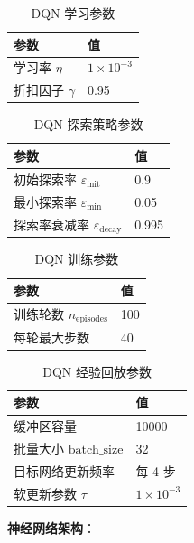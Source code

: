 \begin{table}[H]
\centering
\caption{DQN 学习参数}
\label{tab:dqn_params_learn}
\begin{tabular}{ll}
\hline
\textbf{参数} & \textbf{值} \\
\hline
学习率 $\eta$ & $1 \times 10^{-3}$ \\
折扣因子 $\gamma$ & 0.95 \\
\hline
\end{tabular}
\end{table}

\begin{table}[H]
\centering
\caption{DQN 探索策略参数}
\label{tab:dqn_params_explore}
\begin{tabular}{ll}
\hline
\textbf{参数} & \textbf{值} \\
\hline
初始探索率 $\varepsilon_{\text{init}}$ & 0.9 \\
最小探索率 $\varepsilon_{\text{min}}$ & 0.05 \\
探索率衰减率 $\varepsilon_{\text{decay}}$ & 0.995 \\
\hline
\end{tabular}
\end{table}

\begin{table}[H]
\centering
\caption{DQN 训练参数}
\label{tab:dqn_params_train}
\begin{tabular}{ll}
\hline
\textbf{参数} & \textbf{值} \\
\hline
训练轮数 $n_{\text{episodes}}$ & 100 \\
每轮最大步数 & 40 \\
\hline
\end{tabular}
\end{table}

\begin{table}[H]
\centering
\caption{DQN 经验回放参数}
\label{tab:dqn_params_replay}
\begin{tabular}{ll}
\hline
\textbf{参数} & \textbf{值} \\
\hline
缓冲区容量 & 10000 \\
批量大小 $\text{batch\_size}$ & 32 \\
目标网络更新频率 & 每 4 步 \\
软更新参数 $\tau$ & $1 \times 10^{-3}$ \\
\hline
\end{tabular}
\end{table}

\noindent\textbf{神经网络架构}：

